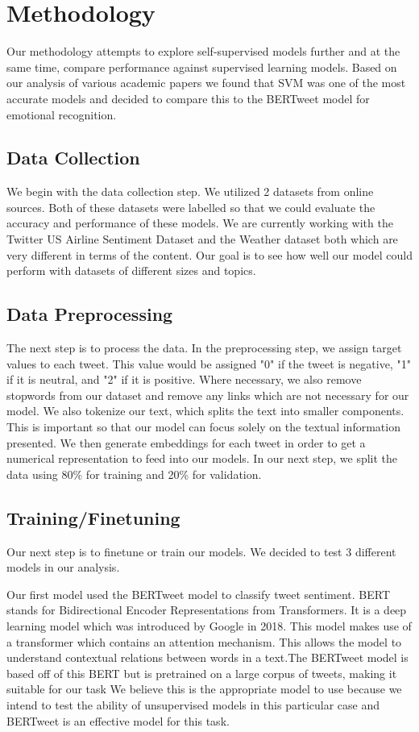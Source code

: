 \documentclass[conference]{IEEEtran}
\begin{document}
\section{Methodology}

Our methodology attempts to explore self-supervised models further and at the same time, compare performance against supervised learning models. Based on our analysis of various academic papers we found that SVM was one of the most accurate models and decided to compare this to the BERTweet model for emotional recognition. 

\subsection{Data Collection}

We begin with the data collection step. 
We utilized 2 datasets from online sources. Both of these datasets were labelled so that we could evaluate the accuracy and performance of these models.
We are currently working with the Twitter US Airline Sentiment Dataset and the Weather dataset both which are very different in terms of the content. 
Our goal is to see how well our model could perform with datasets of different sizes and topics. 

\subsection{Data Preprocessing}
The next step is to process the data. 
In the preprocessing step, we assign target values to each tweet. This value would be assigned "0" if the tweet is negative, "1" if it is neutral, and "2" if it is positive.  Where necessary, we also remove stopwords from our dataset and remove any links which are not necessary for our model. We also tokenize our text, which splits the text into smaller components. This is important so that our model can focus solely on the textual information presented. We then generate embeddings for each tweet in order to get a numerical representation to feed into our models. In our next step, we split the data using 80\%  for training and 20\% for validation.


\subsection{Training/Finetuning}
Our next step is to finetune or train our models. We decided to test 3 different models in our analysis.

Our first model used the BERTweet model to classify tweet sentiment. BERT stands for Bidirectional Encoder Representations from Transformers. It is a deep learning model which was introduced by Google in 2018. This model makes use of a transformer which contains an attention mechanism. This allows the model to understand contextual relations between words in a text\cite{b17}.The BERTweet model is based off of this BERT but is pretrained on a large corpus of tweets, making it suitable for our task  \cite{b18}
We believe this is the appropriate model to use because we intend to test the ability of unsupervised models in this particular case and BERTweet is an effective model for this task.
\end{document}
